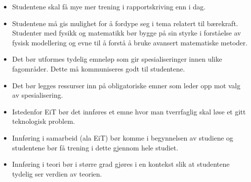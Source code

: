 \begin{itemize}
	\item Studentene skal få mye mer trening i rapportskriving enn i dag.
	\item Studentene må gis mulighet for å fordype seg i tema relatert til bærekraft. Studenter med fysikk og matematikk bør bygge på sin styrke i forståelse av fysisk modellering og evne til å forstå å bruke avansert matematiske metoder.
	\item Det bør utformes tydelig emneløp som gir spesialiseringer innen ulike fagområder. Dette må kommuniseres godt til studentene.
	\item Det bør legges ressurser inn på obligatoriske emner som leder opp mot valg av spesialisering.
	\item Istedenfor EiT bør det innføres et emne hvor man tverrfaglig skal løse et gitt teknologisk problem.
	\item Innføring i samarbeid (ala EiT) bør komme i begynnelsen av studiene og studentene bør få trening i dette gjennom hele studiet.
	\item Innføring i teori bør i større grad gjøres i en kontekst slik at studentene tydelig ser verdien av teorien.
\end{itemize}